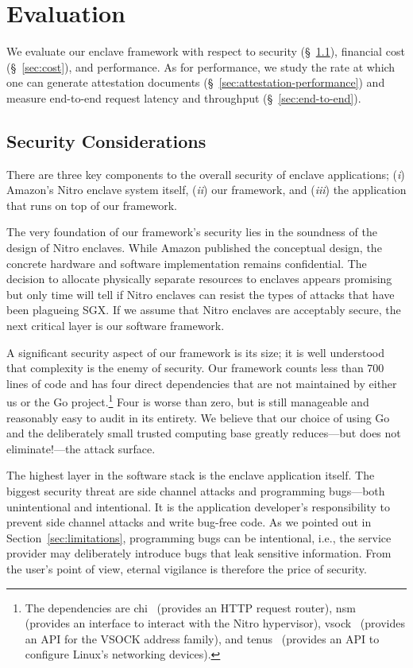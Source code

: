 \section{Evaluation}
\label{sec:evaluation}

We evaluate our enclave framework with respect to
security (\S~\ref{sec:security}),
financial cost (\S~\ref{sec:cost}), and performance.  As for performance, we
study the rate at which one can generate
attestation documents (\S~\ref{sec:attestation-performance}) and
measure end-to-end request latency and throughput (\S~\ref{sec:end-to-end}).

\subsection{Security Considerations}
\label{sec:security}

There are three key components to the overall security of enclave applications;
(\emph{i}) Amazon's Nitro enclave system itself, (\emph{ii}) our framework, and
(\emph{iii}) the application that runs on top of our framework.

The very foundation of our framework's security lies in the soundness of the
design of Nitro enclaves.  While Amazon published the conceptual design, the
concrete hardware and software implementation remains confidential.  The
decision to allocate physically separate resources to enclaves appears promising
but only time will tell if Nitro enclaves can resist the types of attacks that
have been plagueing SGX.  If we assume that Nitro enclaves are acceptably
secure, the next critical layer is our software framework.

A significant security aspect of our framework is its size; it is well
understood that complexity is the enemy of security.  Our framework counts less
than 700 lines of code and has four direct dependencies that are not maintained
by either us or the Go project.\footnote{The dependencies are chi~\cite{chi}
(provides an HTTP request router), nsm~\cite{nsm} (provides an interface to
interact with the Nitro hypervisor), vsock~\cite{vsock} (provides an API for the
VSOCK address family), and tenus~\cite{tenus} (provides an API to configure
Linux's networking devices).}  Four is worse than zero, but is still manageable
and reasonably easy to audit in its entirety.  We believe that our choice of
using Go and the deliberately small trusted computing base greatly reduces---but
does not eliminate!---the attack surface.

The highest layer in the software stack is the enclave application itself.  The
biggest security threat are side channel attacks and programming bugs---both
unintentional and intentional.  It is the application developer's
responsibility to prevent side channel attacks and write bug-free code.  As we
pointed out in Section~\ref{sec:limitations}, programming bugs can be
intentional, i.e., the service provider may deliberately introduce bugs that
leak sensitive information.  From the user's point of view, eternal vigilance
is therefore the price of security.

